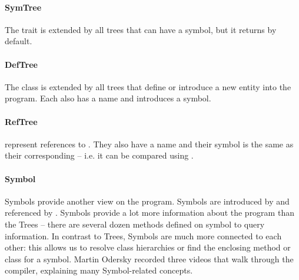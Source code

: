 \paragraph{SymTree} \hfill \begin{footnotesize}\end{footnotesize} \newline

\noindent The  trait is extended by all trees that can have a symbol, but it returns  by default.

\paragraph{DefTree} \hfill \begin{footnotesize}\end{footnotesize} \newline

\noindent The  class is extended by all trees that define or introduce a new entity into the program. Each  also has a name and introduces a symbol.

\paragraph{RefTree} \hfill \begin{footnotesize}\end{footnotesize} \newline

\noindent {} represent references to . They also have a name and their symbol is the same as their corresponding  -- i.e. it can be compared using \src{==}.

\paragraph{Symbol}

Symbols provide another view on the program. Symbols are introduced by  and referenced by . Symbols provide a lot more information about the program than the Trees -- there are several dozen  methods defined on symbol to query information. In contrast to Trees, 
Symbols are much more connected to each other: this allows us to resolve class hierarchies or find the enclosing method or class for a symbol. Martin Odersky recorded three videos \cite{ScalaVideos} that walk through the compiler, explaining many Symbol-related concepts.

